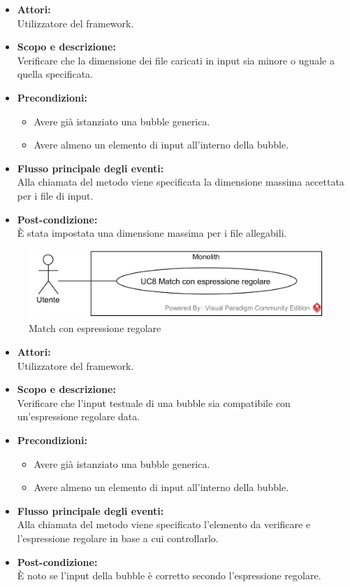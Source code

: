 \begin{itemize}
	\item \textbf{Attori:}
	\\Utilizzatore del framework.
	\item \textbf{Scopo e descrizione:} 
	\\Verificare che la dimensione dei file caricati in input sia minore o uguale a quella specificata.
	\item \textbf{Precondizioni:}
	\begin{itemize}
		\item Avere già istanziato una bubble generica.
		\item Avere almeno un elemento di input all'interno della bubble.
	\end{itemize}
	\item \textbf{Flusso principale degli eventi:}
	\\Alla chiamata del metodo viene specificata la dimensione massima accettata per i file di input.
	\item \textbf{Post-condizione:}
	\\È stata impostata una dimensione massima per i file allegabili.
\end{itemize}


\begin{figure}[H]
	\centering
	\includegraphics[width=15cm]{../../documenti/AnalisiDeiRequisiti/Diagrammi_img/usecase/uc1_10.png}
	\caption{\UCCaption{} Match con espressione regolare}
\end{figure}

\begin{itemize}
	\item \textbf{Attori:}
	\\Utilizzatore del framework.
	\item \textbf{Scopo e descrizione:} 
	\\Verificare che l'input testuale di una bubble sia compatibile con un'espressione regolare data.
	\item \textbf{Precondizioni:}
	\begin{itemize}
		\item Avere già istanziato una bubble generica.
		\item Avere almeno un elemento di input all'interno della bubble.
	\end{itemize}
	\item \textbf{Flusso principale degli eventi:}
	\\Alla chiamata del metodo viene specificato l'elemento da verificare e l'espressione regolare in base a cui controllarlo.
	\item \textbf{Post-condizione:}
	\\È noto se l'input della bubble è corretto secondo l'espressione regolare.
\end{itemize}

